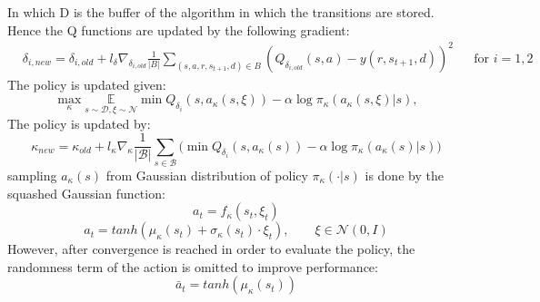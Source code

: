 In which D is the buffer of the algorithm in which the transitions are stored.
Hence the Q functions are updated by the following gradient:
\begin{align}
	& \delta_{i,new} = \delta_{i,old}+ l_{\delta} \nabla_{\delta_{i,old}} \frac{1}{|B|}\sum_{(s,a,r,s_{t+1},d) \in B} \left( Q_{\delta_{i,old}}(s,a) - y(r,s_{t+1},d) \right)^2 && \text{for } i=1,2
\end{align}
The policy is updated given:
\begin{equation}
	\max_{\kappa} \underset{s \sim \mathcal{D}, \xi \sim \mathcal{N}}{\mathbb{E}}{\min Q_{\delta_i}(s,a_{\kappa}(s,\xi)) - \alpha \log \pi_{\kappa}(a_{\kappa}(s,\xi)|s)},
\end{equation}
The policy is updated by:
\begin{equation}
	\kappa_{new}=\kappa_{old} + l_{\kappa}\nabla_{\kappa} \frac{1}{|\mathcal{B}|}\sum_{s \in \mathcal{B}} \Big(\min Q_{\delta_i}(s, a_{\kappa}(s)) - \alpha \log \pi_{\kappa} \left(\left. a_{\kappa}(s) \right| s\right) \Big)
\end{equation}
sampling $a_{\kappa}(s)$ from Gaussian distribution of policy $\pi_{\kappa}(\cdot|s)$ is done by the squashed Gaussian function:
\begin{equation}
	a_t = f_\kappa (s_t, \xi_t)
\end{equation}
\begin{equation}
	a_t = tanh(\mu_\kappa(s_t)+\sigma_\kappa(s_t) \cdot \xi_t), \quad \quad \xi \in \mathcal{N} (0,I)
\end{equation}
However, after convergence is reached in order to evaluate the policy, the randomness term of the action is omitted to improve performance:
\begin{equation}
	\bar{a}_t = tanh(\mu_\kappa(s_t))
\end{equation}

